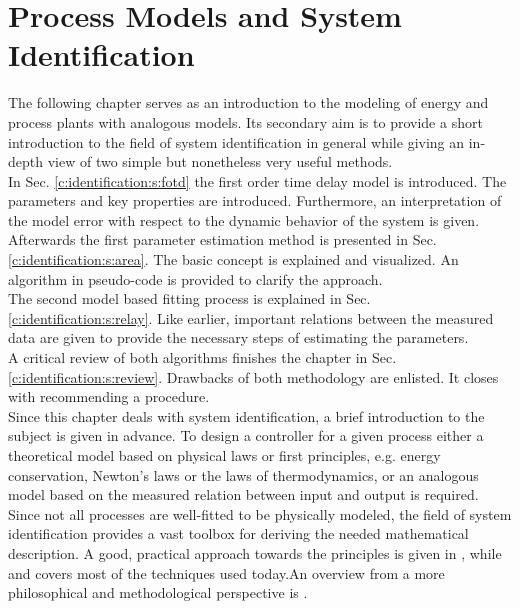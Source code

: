 \chapter{Process Models and System Identification}\label{c:identification}

The following chapter serves as an introduction to the modeling of energy and process plants with analogous models. Its secondary aim is to provide a short introduction to the field of system identification in general while giving an in-depth view of two simple but nonetheless very useful methods. 
\\

In Sec. \ref{c:identification:s:fotd} the first order time delay model is introduced. The parameters and key properties are introduced. Furthermore, an interpretation of the model error with respect to the dynamic behavior of the system is given. \\

Afterwards the first parameter estimation method is presented in Sec. \ref{c:identification:s:area}. The basic concept is explained and visualized. An algorithm in pseudo-code is provided to clarify the approach. \\

The second model based fitting process is explained in Sec. \ref{c:identification:s:relay}. Like earlier, important relations between the measured data are given to provide the necessary steps of estimating the parameters. \\

A critical review of both algorithms finishes the chapter in Sec.\ref{c:identification:s:review}. Drawbacks of both methodology are enlisted. It closes with recommending a procedure.\\

Since this chapter deals with system identification, a brief introduction to the subject is given in advance. To design a controller for a given process either a theoretical model based on physical laws or first principles, e.g. energy conservation, Newton's laws or the laws of thermodynamics, or an analogous model based on the measured relation between input and output is required. Since not all processes are well-fitted to be physically modeled, the field of system identification provides a vast toolbox for deriving the needed mathematical description. A good, practical approach towards the principles is given in \cite{Keesman2011}, while \cite{Isermann1992} and \cite{Isermann1992a} covers most of the techniques used today.An overview from a more philosophical and methodological perspective is \cite{Ljung2010}.\\

